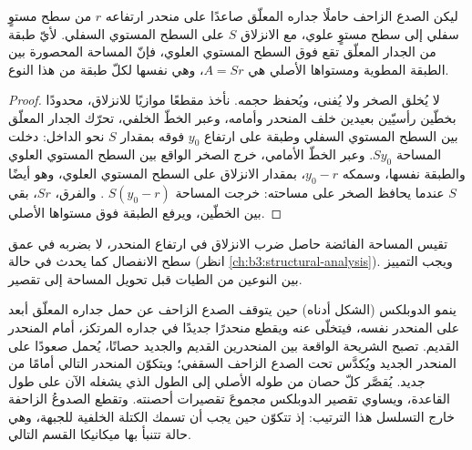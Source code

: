 \begin{omfigure}
\par{}\label{fig:b3:orogenic-wedges:thrusts}
\end{omfigure}


\begin{proposition}\label{prop:b3:orogenic-wedges:fault-bend-area}
ليكن الصدع الزاحف حاملًا جداره المعلّق صاعدًا على منحدر ارتفاعه $r$ من سطح مستوٍ سفلي
إلى سطح مستوٍ علوي، مع الانزلاق $S$ على السطح المستوي السفلي. لأيّ طبقة من الجدار المعلّق تقع فوق السطح المستوي العلوي،
فإنّ المساحة المحصورة بين الطبقة المطوية ومستواها الأصلي
هي $A = Sr$، وهي نفسها لكلّ طبقة من هذا النوع.
\end{proposition}

\begin{proof}
لا يُخلق الصخر ولا يُفنى، ويُحفظ حجمه. نأخذ مقطعًا
موازيًا للانزلاق، محدودًا بخطّين رأسيّين بعيدين خلف المنحدر وأمامه،
وعبر الخطّ الخلفي، تحرّك الجدار المعلّق بين السطح المستوي السفلي
وطبقة على ارتفاع $y_0$ فوقه بمقدار $S$ نحو الداخل: دخلت المساحة
$Sy_0$. وعبر الخطّ الأمامي، خرج الصخر الواقع بين السطح المستوي العلوي
والطبقة نفسها، وسمكه $y_0 - r$، بمقدار الانزلاق على السطح المستوي العلوي،
وهو أيضًا $S$ عندما يحافظ الصخر على مساحته: خرجت المساحة $S(y_0 - r)$
. والفرق، $Sr$، بقي بين الخطّين، ويرفع
الطبقة فوق مستواها الأصلي.
\end{proof}

تقيس المساحة الفائضة  حاصل ضرب الانزلاق في ارتفاع
المنحدر، لا بضربه في عمق سطح الانفصال كما يحدث في حالة
 (انظر \cref{ch:b3:structural-analysis}). ويجب التمييز بين النوعين من الطيات
قبل تحويل المساحة إلى تقصير.


ينمو الدوبلكس (الشكل أدناه) حين يتوقف الصدع الزاحف عن حمل جداره المعلّق
أبعد على المنحدر نفسه، فيتخلّى عنه ويقطع منحدرًا جديدًا في جداره المرتكز،
أمام المنحدر القديم. تصبح الشريحة الواقعة بين المنحدرين القديم والجديد حصانًا،
يُحمل صعودًا على المنحدر الجديد ويُكدَّس تحت الصدع الزاحف السقفي؛ ويتكوّن المنحدر التالي
أمامًا من جديد. يُقصَّر كلّ حصان من طوله الأصلي إلى الطول
الذي يشغله الآن على طول القاعدة، ويساوي تقصير الدوبلكس
مجموعَ تقصيرات أحصنته. وتقطع الصدوعُ الزاحفة خارج التسلسل هذا الترتيب: إذ تتكوّن
حين يجب أن تسمك الكتلة الخلفية للجبهة، وهي حالة تتنبأ بها ميكانيكا
القسم التالي.


